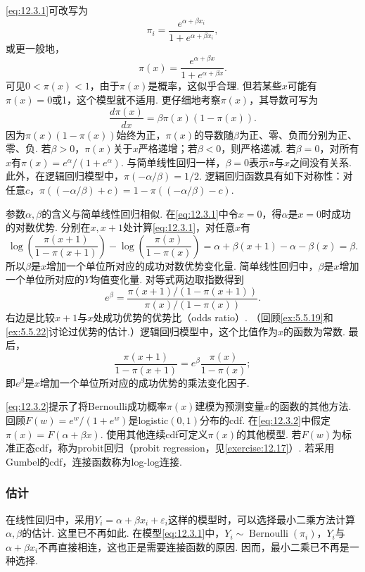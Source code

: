 \eqref{eq:12.3.1}可改写为
$$\pi_i=\frac{e^{\alpha+\beta x_i}}{1+e^{\alpha+\beta x_i}},$$
或更一般地，
\begin{equation}\label{eq:12.3.2}
\pi(x)=\frac{e^{\alpha+\beta x}}{1+e^{\alpha+\beta x}}.
\end{equation}
可见$0<\pi(x)<1$，由于$\pi(x)$是概率，这似乎合理. 但若某些$x$可能有$\pi(x)=0$或1，这个模型就不适用. 更仔细地考察$\pi(x)$，其导数可写为
\begin{equation}\label{eq:12.3.3}
\frac{d\pi(x)}{dx}=\beta\pi(x)(1-\pi(x)).
\end{equation}
因为$\pi(x)(1-\pi(x))$始终为正，$\pi(x)$的导数随$\beta$为正、零、负而分别为正、零、负. 若$\beta>0$，$\pi(x)$关于$x$严格递增；若$\beta<0$，则严格递减. 若$\beta=0$，对所有$x$有$\pi(x)=e^\alpha/(1+e^\alpha)$. 与简单线性回归一样，$\beta=0$表示$\pi$与$x$之间没有关系. 此外，在逻辑回归模型中，$\pi(-\alpha/\beta)=1/2$. 逻辑回归函数具有如下对称性：对任意$c$，$\pi((-\alpha/\beta)+c)=1-\pi((-\alpha/\beta)-c)$.

参数$\alpha,\beta$的含义与简单线性回归相似. 在\eqref{eq:12.3.1}中令$x=0$，得$\alpha$是$x=0$时成功的对数优势. 分别在$x,x+1$处计算\eqref{eq:12.3.1}，对任意$x$有
$$\log\left(\frac{\pi(x+1)}{1-\pi(x+1)}\right)-\log\left(\frac{\pi(x)}{1-\pi(x)}\right)
=\alpha+\beta(x+1)-\alpha-\beta(x)=\beta.$$
所以$\beta$是$x$增加一个单位所对应的成功对数优势变化量. 简单线性回归中，$\beta$是$x$增加一个单位所对应的$Y$均值变化量. 对等式两边取指数得到
\begin{equation}\label{eq:12.3.4}
e^\beta=\frac{\pi(x+1)/(1-\pi(x+1))}{\pi(x)/(1-\pi(x))}.
\end{equation}
右边是比较$x+1$与$x$处成功优势的优势比（odds ratio）. （回顾\autoref{ex:5.5.19}和\autoref{ex:5.5.22}讨论过优势的估计.）逻辑回归模型中，这个比值作为$x$的函数为常数. 最后，
\begin{equation}\label{eq:12.3.5}
\frac{\pi(x+1)}{1-\pi(x+1)}=e^\beta\frac{\pi(x)}{1-\pi(x)};
\end{equation}
即$e^\beta$是$x$增加一个单位所对应的成功优势的乘法变化因子.

\eqref{eq:12.3.2}提示了将Bernoulli成功概率$\pi(x)$建模为预测变量$x$的函数的其他方法. 回顾$F(w)=e^w/(1+e^w)$是logistic$(0,1)$分布的cdf. 在\eqref{eq:12.3.2}中假定$\pi(x)=F(\alpha+\beta x)$. 使用其他连续cdf可定义$\pi(x)$的其他模型. 若$F(w)$为标准正态cdf，称为probit回归（probit regression，见\autoref{exercise:12.17}）. 若采用Gumbel的cdf，连接函数称为log-log连接.

\subsubsection{估计}\label{sec:12.3.2}
在线性回归中，采用$Y_i=\alpha+\beta x_i+\varepsilon_i$这样的模型时，可以选择最小二乘方法计算$\alpha,\beta$的估计. 这里已不再如此. 在模型\eqref{eq:12.3.1}中，$Y_i\sim\operatorname{Bernoulli}(\pi_i)$，$Y_i$与$\alpha+\beta x_i$不再直接相连，这也正是需要连接函数的原因. 因而，最小二乘已不再是一种选择.


